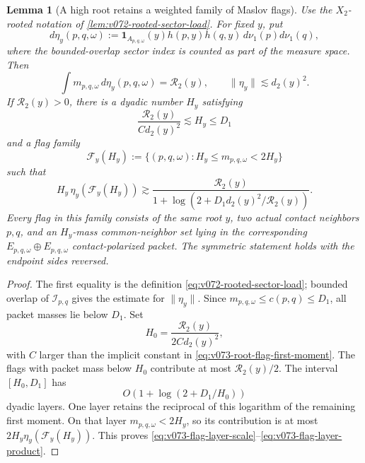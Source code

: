 \documentclass[10pt]{article}
\newtheorem{lemma}[theorem]{Lemma}
\begin{document}
\begin{lemma}[A high root retains a weighted family of Maslov flags]
\label{lem:v073-high-root-flag-layer}
Use the \(X_2\)-rooted notation of \cref{lem:v072-rooted-sector-load}.  For fixed \(y\), put
\[
d\eta_y(p,q,\omega)
:=
\mathbf 1_{A_{p,q,\omega}}(y)
h(p,y)h(q,y)\,d\nu_1(p)d\nu_1(q),
\]
where the bounded-overlap sector index is counted as part of the measure space.  Then
\begin{equation}
\label{eq:v073-root-flag-first-moment}
\int m_{p,q,\omega}\,d\eta_y(p,q,\omega)
=\mathcal R_2(y),
\qquad
\|\eta_y\|\lesssim d_2(y)^2.
\end{equation}
If \(\mathcal R_2(y)>0\), there is a dyadic number \(H_y\) satisfying
\begin{equation}
\label{eq:v073-flag-layer-scale}
\boxed{
\frac{\mathcal R_2(y)}{C d_2(y)^2}
\lesssim H_y\le D_1
}
\end{equation}
and a flag family
\[
\mathscr F_y(H_y)
:=
\{(p,q,\omega):H_y\le m_{p,q,\omega}<2H_y\}
\]
such that
\begin{equation}
\label{eq:v073-flag-layer-product}
\boxed{
H_y\,\eta_y(\mathscr F_y(H_y))
\gtrsim
\frac{\mathcal R_2(y)}
{1+\log\!\left(2+D_1d_2(y)^2/\mathcal R_2(y)\right)}.
}
\end{equation}
Every flag in this family consists of the same root \(y\), two actual contact neighbors \(p,q\),
and an \(H_y\)-mass common-neighbor set lying in the corresponding
\(E_{p,q,\omega}\oplus E_{p,q,\omega}\) contact-polarized packet.  The symmetric statement holds
with the endpoint sides reversed.
\end{lemma}

\begin{proof}
The first equality is the definition \eqref{eq:v072-rooted-sector-load}; bounded overlap of
\(\mathscr I_{p,q}\) gives the estimate for \(\|\eta_y\|\).  Since
\(m_{p,q,\omega}\le c(p,q)\le D_1\), all packet masses lie below \(D_1\).  Set
\[
H_0=\frac{\mathcal R_2(y)}{2C d_2(y)^2},
\]
with \(C\) larger than the implicit constant in
\eqref{eq:v073-root-flag-first-moment}.  The flags with packet mass below \(H_0\) contribute at most
\(\mathcal R_2(y)/2\).  The interval \([H_0,D_1]\) has
\[
O\!\left(1+\log(2+D_1/H_0)\right)
\]
dyadic layers.  One layer retains the reciprocal of this logarithm of the remaining first moment.
On that layer \(m_{p,q,\omega}<2H_y\), so its contribution is at most
\(2H_y\eta_y(\mathscr F_y(H_y))\).  This proves
\eqref{eq:v073-flag-layer-scale}--\eqref{eq:v073-flag-layer-product}.
\end{proof}
\end{document}
